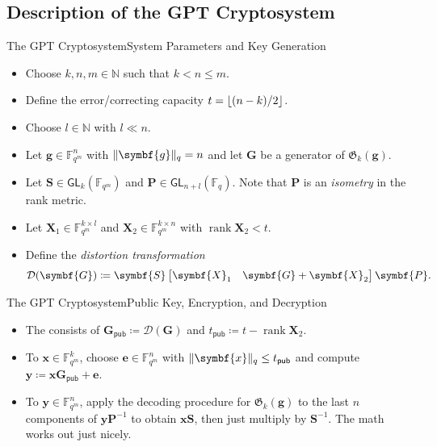 \documentclass[usepdftitle=false]{beamer}
\renewcommand*{\vec}{\symbf}
\newcommand*{\mat}{\symbf}
\DeclareMathOperator{\rank}{rank}
\newcommand*{\GL}{\ensuremath{\mathsf{GL}}}
\newcommand*{\pub}{\ensuremath{\mathsf{pub}}}
\newcommand*{\FF}{\ensuremath{\mathbb{F}}}
\newcommand*{\NN}{\ensuremath{\mathbb{N}}}
\newcommand*{\Gab}{\ensuremath{\mathfrak{G}}}
\DeclarePairedDelimiter{\floor}{\lfloor}{\rfloor}
\DeclarePairedDelimiter{\norm}{\lVert}{\rVert}
\newcommand*{\normR}[2]{\ensuremath{\norm{#1}_{#2}}}
\newcommand*{\Distort}{\mathcal{D}}
\begin{document}
\subsection{Description of the GPT Cryptosystem}

\begin{frame}{The GPT Cryptosystem}{System Parameters and Key Generation}
  \begin{itemize}
  \item Choose \(k, n, m \in \NN\) such that \(k < n \le m\).
  \item Define the error\-/correcting capacity
    \(t = \floor{(n - k) / {2}}\).
  \item Choose \(l \in \NN\) with \(l \ll n\).
  \end{itemize}

  \begin{itemize}
  \item Let \(\vec{g} \in \FF_{q^m}^n\) with
    \(\normR{\vec{g}}{q} = n\) and let \(\mat{G}\) be a generator of
    \(\Gab_k(\vec{g})\).
  \item Let \(\mat{S} \in \GL_k(\FF_{q^m})\) and
    \(\mat{P} \in \GL_{n + l}(\FF_q)\).  Note that \(\mat{P}\) is an
    \emph{isometry} in the rank metric.
  \item Let \(\mat{X}_1 \in \FF_{q^m}^{k \times l}\) and
    \(\mat{X}_2 \in \FF_{q^m}^{k \times n}\) with
    \(\rank\mat{X}_2 < t\).
  \item Define the \emph{distortion transformation}
    \[
      \Distort(\mat{G}) \coloneqq
      \mat{S}
      \begin{bmatrix} \mat{X}_1 & \mat{G} + \mat{X}_2 \end{bmatrix}
      \mat{P}\text.
    \]
  \end{itemize}
\end{frame}

\begin{frame}{The GPT Cryptosystem}{Public Key, Encryption, and Decryption}
  \begin{itemize}
  \item The  consists of
    \(\mat{G}_{\pub} \coloneqq \Distort(\mat{G})\) and
    \(t_{\pub} \coloneqq t - \rank\mat{X}_2\).
  \item To  \(\vec{x} \in \FF_{q^m}^k\), choose
    \(\vec{e} \in \FF_{q^m}^n\) with
    \(\normR{\vec{x}}{q} \le t_{\pub}\) and compute
    \(\vec{y} \coloneqq \vec{x} \mat{G}_{\pub} + \vec{e}\).
  \item To  \(\vec{y} \in \FF_{q^m}^n\), apply the
    decoding procedure for \(\Gab_k(\vec{g})\) to the last \(n\)
    components of \(\vec{y} \mat{P}^{-1}\) to obtain
    \(\vec{x} \mat{S}\), then just multiply by \(\mat{S}^{-1}\).
    \alert{The math works out just nicely}.
  \end{itemize}
\end{frame}
\end{document}
